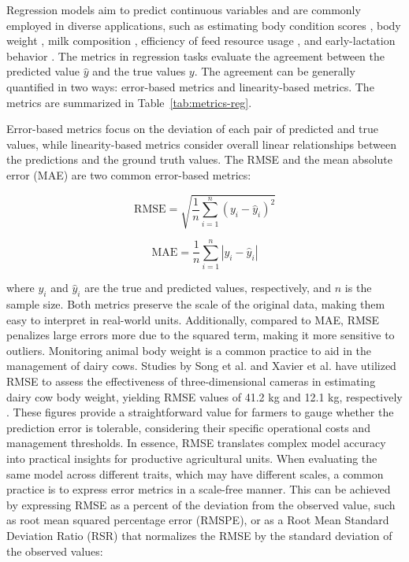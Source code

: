 Regression models aim to predict continuous variables and are commonly employed in diverse applications, such as estimating body condition scores \citep{spoliansky_development_2016, yukun_automatic_2019}, body weight \citep{song_automated_2018,xavier_use_2022}, milk composition \citep{rovere_prediction_2021,mota_real-time_2022,mantysaari_body_2019,frizzarin_predicting_2021}, efficiency of feed resource usage \citep{grelet_potential_2020, appuhamy_prediction_2016,de_souza_predicting_2018}, and early-lactation behavior \citep{van_dixhoorn_indicators_2018}. The metrics in regression tasks evaluate the agreement between the predicted value $\hat{y}$ and the true values $y$. The agreement can be generally quantified in two ways: error-based metrics and linearity-based metrics. The metrics are summarized in Table~\ref{tab:metrics-reg}. 

Error-based metrics focus on the deviation of each pair of predicted and true values, while linearity-based metrics consider overall linear relationships between the predictions and the ground truth values. The RMSE and the mean absolute error (MAE) are two common error-based metrics:

\begin{equation} \label{eq_rmse}
\text{RMSE} = \sqrt{\frac{1}{n} \sum_{i=1}^{n} (y_i - \hat{y}_i)^2}
\end{equation}

\begin{equation} \label{eq_mae}
    \text{MAE} = \frac{1}{n} \sum_{i=1}^{n} |y_i - \hat{y}_i|
\end{equation}

where $y_i$ and $\hat{y}_i$ are the true and predicted values, respectively, and $n$ is the sample size. Both metrics preserve the scale of the original data, making them easy to interpret in real-world units. Additionally, compared to MAE, RMSE penalizes large errors more due to the squared term, making it more sensitive to outliers. Monitoring animal body weight is a common practice to aid in the management of dairy cows. Studies by Song et al. and Xavier et al. have utilized RMSE to assess the effectiveness of three-dimensional cameras in estimating dairy cow body weight, yielding RMSE values of 41.2 kg and 12.1 kg, respectively \citep{song_automated_2018,xavier_use_2022}. These figures provide a straightforward value for farmers to gauge whether the prediction error is tolerable, considering their specific operational costs and management thresholds. In essence, RMSE translates complex model accuracy into practical insights for productive agricultural units.
When evaluating the same model across different traits, which may have different scales, a common practice is to express error metrics in a scale-free manner. This can be achieved by expressing RMSE as a percent of the deviation from the observed value, such as root mean squared percentage error (RMSPE), or as a Root Mean Standard Deviation Ratio (RSR) that normalizes the RMSE by the standard deviation of the observed values:

